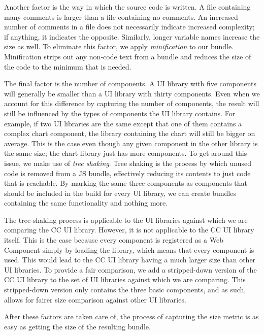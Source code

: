 Another factor is the way in which the source code is written. A file containing many comments is larger than a file containing no comments. An increased number of comments in a file does not necessarily indicate increased complexity; if anything, it indicates the opposite. Similarly, longer variable names increase the size as well. To eliminate this factor, we apply \emph{minification} to our bundle. Minification strips out any non-code text from a bundle and reduces the size of the code to the minimum that is needed.

The final factor is the number of components. A UI library with five components will generally be smaller than a UI library with thirty components. Even when we account for this difference by capturing the number of components, the result will still be influenced by the types of components the UI library contains. For example, if two UI libraries are the same except that one of them contains a complex chart component, the library containing the chart will still be bigger on average. This is the case even though any given component in the other library is the same size; the chart library just has more components. To get around this issue, we make use of \emph{tree shaking}. Tree shaking is the process by which unused code is removed from a JS bundle, effectively reducing its contents to just code that is reachable. By marking the same three components as components that should be included in the build for every UI library, we can create bundles containing the same functionality and nothing more.

The tree-shaking process is applicable to the UI libraries against which we are comparing the CC UI library. However, it is not applicable to the CC UI library itself. This is the case because every component is registered as a Web Component simply by loading the library, which means that every component is used. This would lead to the CC UI library having a much larger size than other UI libraries. To provide a fair comparison, we add a stripped-down version of the CC UI library to the set of UI libraries against which we are comparing. This stripped-down version only contains the three basic components, and as such, allows for fairer size comparison against other UI libraries.

After these factors are taken care of, the process of capturing the size metric is as easy as getting the size of the resulting bundle.

